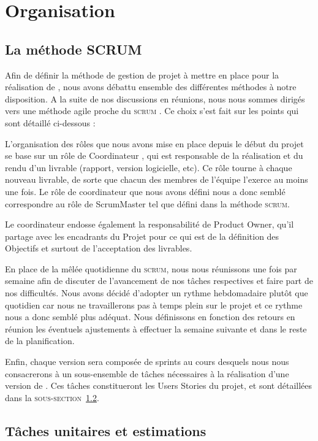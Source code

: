 \section{Organisation}
	\label{sec:orga}
	\subsection{La méthode SCRUM}
		\label{subsec:scrum}

	Afin de définir la méthode de gestion de projet à mettre en place pour la réalisation de \glasir{}, nous avons débattu ensemble des différentes méthodes à notre disposition. A la suite de 	nos discussions en réunions, nous nous sommes dirigés vers une méthode agile proche du \og \textsc{scrum} \fg{}. Ce choix s'est fait sur les points qui sont détaillé ci-dessous :

	L'organisation des rôles que nous avons mise en place depuis le début du projet se base sur un rôle de \og Coordinateur \fg{}, qui est responsable de la réalisation et du rendu d'un livrable (rapport, version logicielle, etc). Ce rôle tourne à chaque nouveau livrable, de sorte que chacun des membres de l'équipe l'exerce au moins une fois. Le rôle de coordinateur que nous avons défini nous a donc semblé correspondre au rôle de ScrumMaster tel que défini dans la méthode \textsc{scrum}.

	Le coordinateur endosse également la responsabilité de Product Owner, qu'il partage avec les encadrants du Projet pour ce qui est de la définition des Objectifs et surtout de l'acceptation des livrables.

	En place de la mêlée quotidienne du \textsc{scrum}, nous nous réunissons une fois par semaine afin de discuter de l'avancement de nos tâches respectives et faire part de nos difficultés. Nous avons décidé d'adopter un rythme hebdomadaire plutôt que quotidien car nous ne travaillerons pas à temps plein sur le projet et ce rythme nous a donc semblé plus adéquat. Nous définissons en fonction des retours en réunion les éventuels ajustements à effectuer la semaine suivante et dans le reste de la planification.

	Enfin, chaque version sera composée de sprints au cours desquels nous nous consacrerons à un sous-ensemble de tâches nécessaires à la réalisation d'une version de \glasir{}. Ces tâches constitueront les Users Stories du projet, et sont détaillées dans la \textsc{sous-section}~\ref{subsec:taches_unitaires}.  
	
	\subsection{Tâches unitaires et estimations}
		\label{subsec:taches_unitaires}

